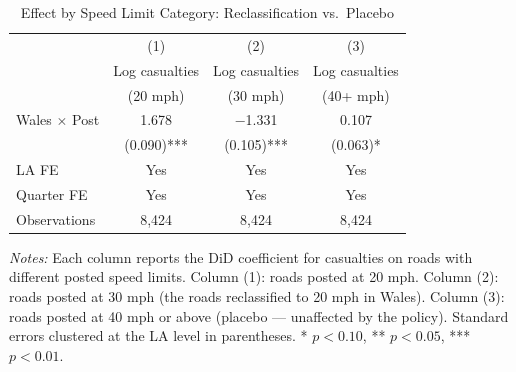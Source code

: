 \begin{table}[H]
\centering
\caption{Effect by Speed Limit Category: Reclassification vs.\ Placebo}
\label{tab:mechanism}
\begin{threeparttable}
\begin{tabular}{lccc}
\toprule
& (1) & (2) & (3) \\
& Log casualties & Log casualties & Log casualties \\
& (20 mph) & (30 mph) & (40+ mph) \\
\midrule
Wales $\times$ Post & 1.678 & $-$1.331 & 0.107 \\
& (0.090)*** & (0.105)*** & (0.063)* \\
\midrule
LA FE & Yes & Yes & Yes \\
Quarter FE & Yes & Yes & Yes \\
Observations & 8,424 & 8,424 & 8,424 \\
\bottomrule
\end{tabular}
\begin{tablenotes}[flushleft]
\small
\item \textit{Notes:} Each column reports the DiD coefficient for casualties on roads with different posted speed limits. Column (1): roads posted at 20 mph. Column (2): roads posted at 30 mph (the roads reclassified to 20 mph in Wales). Column (3): roads posted at 40 mph or above (placebo --- unaffected by the policy). Standard errors clustered at the LA level in parentheses. * $p<0.10$, ** $p<0.05$, *** $p<0.01$.
\end{tablenotes}
\end{threeparttable}
\end{table}


